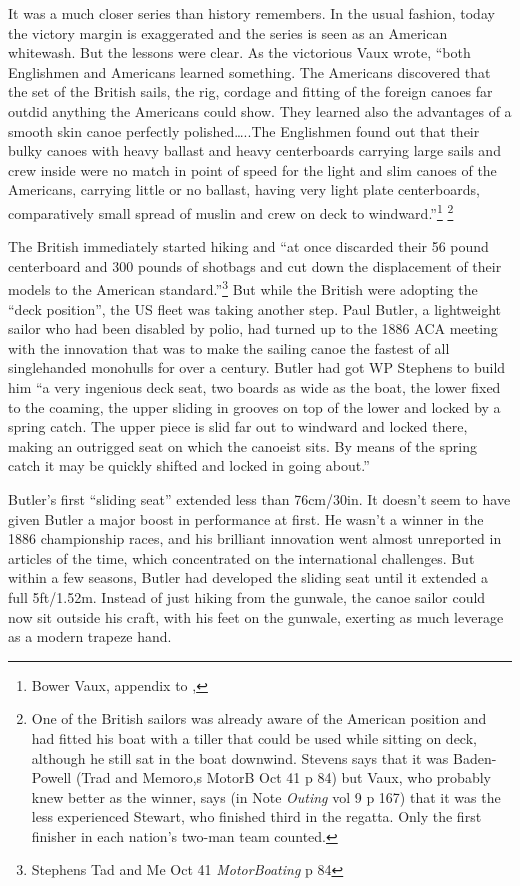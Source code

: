 \documentclass[
  letterpaper,
]{scrbook}
\begin{document}
It was a much closer series than history remembers. In the usual
fashion, today the victory margin is exaggerated and the series is seen
as an American whitewash. But the lessons were clear. As the victorious
Vaux wrote, ``both Englishmen and Americans learned something. The
Americans discovered that the set of the British sails, the rig, cordage
and fitting of the foreign canoes far outdid anything the Americans
could show. They learned also the advantages of a smooth skin canoe
perfectly polished\ldots..The Englishmen found out that their bulky
canoes with heavy ballast and heavy centerboards carrying large sails
and crew inside were no match in point of speed for the light and slim
canoes of the Americans, carrying little or no ballast, having very
light plate centerboards, comparatively small spread of muslin and crew
on deck to windward.''\footnote{Bower Vaux, appendix to ,} \footnote{One
  of the British sailors was already aware of the American position and
  had fitted his boat with a tiller that could be used while sitting on
  deck, although he still sat in the boat downwind. Stevens says that it
  was Baden-Powell (Trad and Memoro,s MotorB Oct 41 p 84) but Vaux, who
  probably knew better as the winner, says (in Note \emph{Outing} vol 9
  p 167) that it was the less experienced Stewart, who finished third in
  the regatta. Only the first finisher in each nation's two-man team
  counted.}

The British immediately started hiking and ``at once discarded their 56
pound centerboard and 300 pounds of shotbags and cut down the
displacement of their models to the American standard.''\footnote{Stephens
  Tad and Me Oct 41 \emph{MotorBoating} p 84} But while the British were
adopting the ``deck position'', the US fleet was taking another step.
Paul Butler, a lightweight sailor who had been disabled by polio, had
turned up to the 1886 ACA meeting with the innovation that was to make
the sailing canoe the fastest of all singlehanded monohulls for over a
century. Butler had got WP Stephens to build him ``a very ingenious deck
seat, two boards as wide as the boat, the lower fixed to the coaming,
the upper sliding in grooves on top of the lower and locked by a spring
catch. The upper piece is slid far out to windward and locked there,
making an outrigged seat on which the canoeist sits. By means of the
spring catch it may be quickly shifted and locked in going about.''

Butler's first ``sliding seat'' extended less than 76cm/30in. It doesn't
seem to have given Butler a major boost in performance at first. He
wasn't a winner in the 1886 championship races, and his brilliant
innovation went almost unreported in articles of the time, which
concentrated on the international challenges. But within a few seasons,
Butler had developed the sliding seat until it extended a full
5ft/1.52m. Instead of just hiking from the gunwale, the canoe sailor
could now sit outside his craft, with his feet on the gunwale, exerting
as much leverage as a modern trapeze hand.
\end{document}
